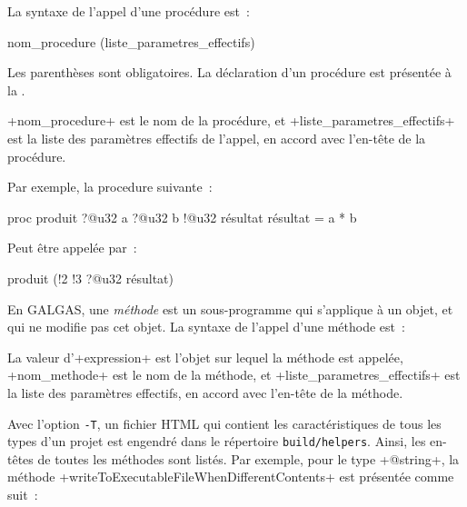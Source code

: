 
La syntaxe de l'appel d'une procédure est~:
\begin{galgas4box}
nom_procedure (liste_parametres_effectifs)
\end{galgas4box}

Les parenthèses sont obligatoires. La déclaration d'un procédure est présentée à la .

\ggsq+nom_procedure+ est le nom de la procédure, et \ggsq+liste_parametres_effectifs+ est la liste des paramètres effectifs de l'appel, en accord avec l'en-tête de la procédure.

Par exemple, la procedure suivante~:
\begin{galgas4}
proc produit ?@u32 a ?@u32 b !@u32 résultat {
  résultat = a * b
}
\end{galgas4}

Peut être appelée par~:
\begin{galgas4}
produit (!2 !3 ?@u32 résultat)
\end{galgas4}
















En GALGAS, une \emph{méthode} est un sous-programme qui s'applique à un objet, et qui ne modifie pas cet objet. La syntaxe de l'appel d'une méthode est~:
\begin{galgas4}
\end{galgas4}

La valeur d'\ggsq+expression+ est l'objet sur lequel la méthode est appelée, \ggsq+nom_methode+ est le nom de la méthode, et \ggsq+liste_parametres_effectifs+ est la liste des paramètres effectifs, en accord avec l'en-tête de la méthode.

Avec l'option \texttt{-T}, un fichier HTML qui contient les caractéristiques de tous les types d'un projet est engendré dans le répertoire \texttt{build/helpers}. Ainsi, les en-têtes de toutes les méthodes sont listés. Par exemple, pour le type \ggsq+@string+, la méthode \ggsq+writeToExecutableFileWhenDifferentContents+ est présentée comme suit~:

